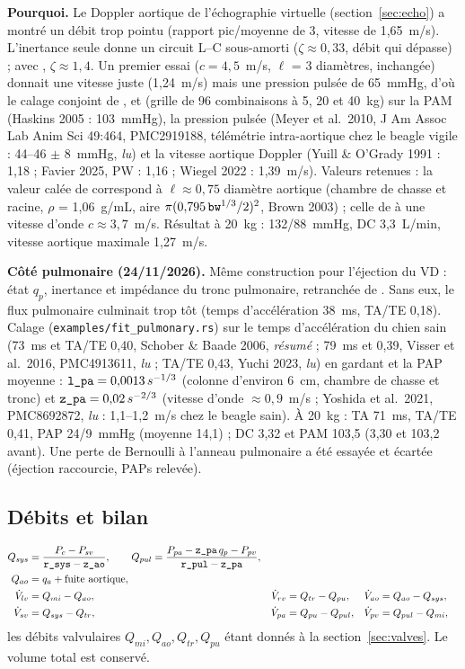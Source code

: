 \documentclass[10pt,a4paper]{article}
\newcommand{\cmd}[1]{\texttt{#1}}
\newcommand{\vp}[1]{\text{\texttt{\detokenize{#1}}}}
\newcommand{\acc}[1]{\textsl{#1}}
\begin{document}
\textbf{Pourquoi.} Le Doppler aortique de l'échographie virtuelle (section~\ref{sec:echo}) a montré un débit trop pointu (rapport pic/moyenne de 3, vitesse de 1,65~m/s). L'inertance seule donne un circuit L--C sous-amorti ($\zeta \approx 0{,}33$, débit qui dépasse) ; avec \vp{z_ao}, $\zeta \approx 1{,}4$. Un premier essai ($c = 4{,}5$~m/s, $\ell$ = 3 diamètres, \vp{c_ao} inchangée) donnait une vitesse juste (1,24~m/s) mais une pression pulsée de 65~mmHg, d'où le calage conjoint de \vp{c_ao}, \vp{z_ao} et \vp{l_ao} (grille de 96 combinaisons à 5, 20 et 40~kg) sur la PAM (Haskins 2005 : 103~mmHg), la pression pulsée (Meyer et al.\ 2010, J Am Assoc Lab Anim Sci 49:464, PMC2919188, télémétrie intra-aortique chez le beagle vigile : 44--46 $\pm$ 8~mmHg, \acc{lu}) et la vitesse aortique Doppler (Yuill \& O'Grady 1991 : 1,18 ; Favier 2025, PW : 1,16 ; Wiegel 2022 : 1,39~m/s). Valeurs retenues : la valeur calée de \vp{l_ao} correspond à $\ell \approx 0{,}75$ diamètre aortique (chambre de chasse et racine, $\rho$ = 1,06~g/mL, aire $\pi(0{,}795\,\vp{bw}^{1/3}/2)^2$, Brown 2003) ; celle de \vp{z_ao} à une vitesse d'onde $c \approx 3{,}7$~m/s. Résultat à 20~kg : 132/88~mmHg, DC 3,3~L/min, vitesse aortique maximale 1,27~m/s.

\textbf{Côté pulmonaire (24/11/2026).} Même construction pour l'éjection du VD : état $q_p$, inertance \vp{l_pa} et impédance \vp{z_pa} du tronc pulmonaire, retranchée de \vp{r_pul}. Sans eux, le flux pulmonaire culminait trop tôt (temps d'accélération 38~ms, TA/TE 0,18). Calage (\cmd{examples/fit\_pulmonary.rs}) sur le temps d'accélération du chien sain (73~ms et TA/TE 0,40, Schober \& Baade 2006, \acc{résumé} ; 79~ms et 0,39, Visser et al.\ 2016, PMC4913611, \acc{lu} ; TA/TE 0,43, Yuchi 2023, \acc{lu}) en gardant \vp{c_pa} et la PAP moyenne : $\vp{l_pa} = 0{,}0013\,s^{-1/3}$ (colonne d'environ 6~cm, chambre de chasse et tronc) et $\vp{z_pa} = 0{,}02\,s^{-2/3}$ (vitesse d'onde $\approx 0{,}9$~m/s ; Yoshida et al.\ 2021, PMC8692872, \acc{lu} : 1,1--1,2~m/s chez le beagle sain). À 20~kg : TA 71~ms, TA/TE 0,41, PAP 24/9~mmHg (moyenne 14,1) ; DC 3,32 et PAM 103,5 (3,30 et 103,2 avant). Une perte de Bernoulli à l'anneau pulmonaire a été essayée et écartée (éjection raccourcie, PAPs relevée).

\subsection{Débits et bilan}
\begin{align}
Q_{sys} &= \frac{P_c - P_{sv}}{\vp{r_sys} - \vp{z_ao}}, \qquad Q_{pul} = \frac{P_{pa} - \vp{z_pa}\,q_p - P_{pv}}{\vp{r_pul} - \vp{z_pa}},\\
Q_{ao} &= q_a + \text{fuite aortique},\\
\dot V_{lv} &= Q_{mi} - Q_{ao}, & \dot V_{rv} &= Q_{tr} - Q_{pu}, & \dot V_{ao} &= Q_{ao} - Q_{sys},\\
\dot V_{sv} &= Q_{sys} - Q_{tr}, & \dot V_{pa} &= Q_{pu} - Q_{pul}, & \dot V_{pv} &= Q_{pul} - Q_{mi},
\end{align}
les débits valvulaires $Q_{mi}, Q_{ao}, Q_{tr}, Q_{pu}$ étant donnés à la section~\ref{sec:valves}. Le volume total est conservé.
\end{document}
